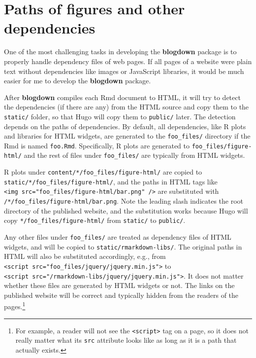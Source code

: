 \documentclass[12pt,]{krantz}
\theoremstyle{definition}
\theoremstyle{definition}
\theoremstyle{definition}
\theoremstyle{remark}
\begin{document}
\hypertarget{dep-path}{%
\section{Paths of figures and other dependencies}\label{dep-path}}

One of the most challenging tasks in developing the \textbf{blogdown}
package is to properly handle dependency files
of web pages. If all pages of a website were plain text without
dependencies like images or JavaScript libraries, it would be much
easier for me to develop the \textbf{blogdown} package.

After \textbf{blogdown} compiles each Rmd document to HTML, it will try
to detect the dependencies (if there are any) from the HTML source and
copy them to the \texttt{static/} folder, so that Hugo will copy them to
\texttt{public/} later. The detection depends on the paths of
dependencies. By default, all dependencies, like R plots and libraries
for HTML widgets, are generated to the \texttt{foo\_files/} directory if
the Rmd is named \texttt{foo.Rmd}. Specifically, R plots are generated
to \texttt{foo\_files/figure-html/} and the rest of files under
\texttt{foo\_files/} are typically from HTML widgets.

R plots under \texttt{content/*/foo\_files/figure-html/} are copied to
\texttt{static/*/foo\_files/figure-html/}, and the paths in HTML tags
like
\texttt{\textless{}img\ src="foo\_files/figure-html/bar.png"\ /\textgreater{}}
are substituted with \texttt{/*/foo\_files/figure-html/bar.png}. Note
the leading slash indicates the root directory of the published website,
and the substitution works because Hugo will copy
\texttt{*/foo\_files/figure-html/} from \texttt{static/} to
\texttt{public/}.

Any other files under \texttt{foo\_files/} are treated as dependency
files of HTML widgets, and will be copied to
\texttt{static/rmarkdown-libs/}. The original paths in HTML will also be
substituted accordingly, e.g., from
\texttt{\textless{}script\ src="foo\_files/jquery/jquery.min.js"\textgreater{}}
to
\texttt{\textless{}script\ src="/rmarkdown-libs/jquery/jquery.min.js"\textgreater{}}.
It does not matter whether these files are generated by HTML widgets or
not. The links on the published website will be correct and typically
hidden from the readers of the pages.\footnote{For example, a reader
  will not see the \texttt{\textless{}script\textgreater{}} tag on a
  page, so it does not really matter what its \texttt{src} attribute
  looks like as long as it is a path that actually exists.}
\end{document}
